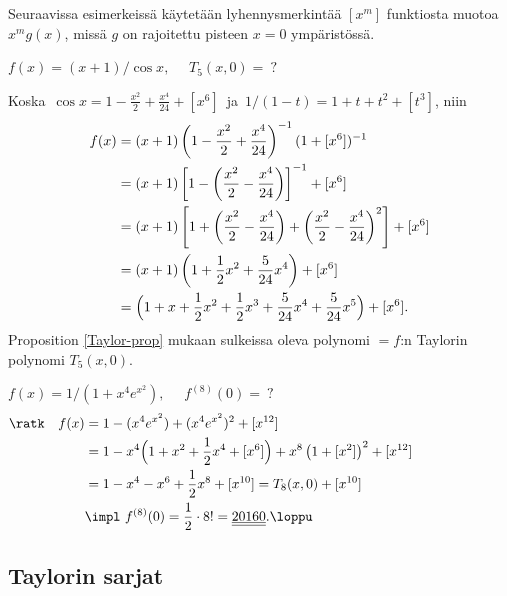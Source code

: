 Seuraavissa esimerkeissä käytetään lyhennysmerkintää $[x^m]$ funktiosta muotoa $x^m g(x)$, 
missä $g$ on rajoitettu pisteen $x=0$ ympäristössä.
\begin{Exa} \label{nopea Taylor 1}
$f(x)=(x+1)/\cos x,\quad$ $T_5(x,0)=\ ?$
\end{Exa}
\ratk Koska $\,\cos x=1-\frac{x^2}{2}+\frac{x^4}{24}+[x^6]\,$ ja
$\,1/(1-t)=1+t+t^2+[t^3]$, niin
\begin{align*}
f(x) &= (x+1)\left(1-\frac{x^2}{2}+\frac{x^4}{24}\right)^{-1}(1+[x^6])^{-1} \\
     &= (x+1)\left[1-\left(\frac{x^2}{2}-\frac{x^4}{24}\right)\right]^{-1}+[x^6] \\
     &= (x+1)\left[1+\left(\frac{x^2}{2}-\frac{x^4}{24}\right)
                    +\left(\frac{x^2}{2}-\frac{x^4}{24}\right)^2\right]+[x^6] \\ 
     &= (x+1)\left(1+\frac{1}{2}x^2+\frac{5}{24}x^4\right)+[x^6] \\
     &= \Bigl(1+x+\frac{1}{2}x^2+\frac{1}{2}x^3+\frac{5}{24}x^4+\frac{5}{24}x^5\Bigr)+[x^6].
\end{align*}
Proposition \ref{Taylor-prop} mukaan sulkeissa oleva polynomi $=f$:n Taylorin polynomi 
$T_5(x,0)$. \loppu
\begin{Exa} \label{nopea Taylor 2}
$f(x)=1/(1+x^4e^{x^2}),\quad$ $f^{(8)}(0)=\ ?$
\begin{align*}
\text{\ratk} \quad f(x) &= 1-(x^4e^{x^2})+(x^4e^{x^2})^2+[x^{12}] \hspace{6cm} \\
                        &= 1-x^4\Bigl(1+x^2+\frac{1}{2}x^4+[x^6]\Bigr)
                                           +x^8\left(1+[x^2]\right)^2+[x^{12}] \\
                        &= 1-x^4-x^6+\frac{1}{2}x^8+[x^{10}] = T_8(x,0)+[x^{10}] \\
                        &\impl \ f^{(8)}(0) = \frac{1}{2}\cdot8!=\underline{\underline{20160}}.
                                                                                       \loppu
\end{align*}
\end{Exa}

\subsection*{Taylorin sarjat}

